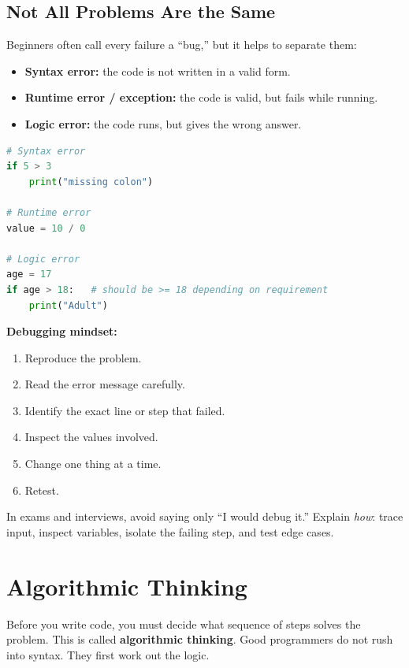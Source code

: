 \documentclass[12pt, a4paper, oneside]{book}
\begin{document}
\subsection{Not All Problems Are the Same}
Beginners often call every failure a ``bug,'' but it helps to separate them:
\begin{itemize}[leftmargin=2em]
    \item \textbf{Syntax error:} the code is not written in a valid form.
    \item \textbf{Runtime error / exception:} the code is valid, but fails while running.
    \item \textbf{Logic error:} the code runs, but gives the wrong answer.
\end{itemize}

\begin{lstlisting}[language=Python, caption={Three kinds of failure}]
# Syntax error
if 5 > 3
    print("missing colon")

# Runtime error
value = 10 / 0

# Logic error
age = 17
if age > 18:   # should be >= 18 depending on requirement
    print("Adult")
\end{lstlisting}

\textbf{Debugging mindset:}
\begin{enumerate}[leftmargin=2em]
    \item Reproduce the problem.
    \item Read the error message carefully.
    \item Identify the exact line or step that failed.
    \item Inspect the values involved.
    \item Change one thing at a time.
    \item Retest.
\end{enumerate}

\begin{examtipbox}
In exams and interviews, avoid saying only ``I would debug it.'' Explain \emph{how}: trace input, inspect variables, isolate the failing step, and test edge cases.
\end{examtipbox}

\section{Algorithmic Thinking}

Before you write code, you must decide what sequence of steps solves the problem. This is called \textbf{algorithmic thinking}. Good programmers do not rush into syntax. They first work out the logic.
\end{document}
